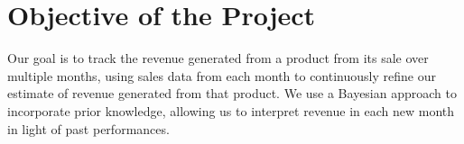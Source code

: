 \section{Objective of the Project}

Our goal is to track the revenue generated from a product from its sale over multiple months, using sales data from each month to continuously refine our estimate of revenue generated from that product.
We use a Bayesian approach to incorporate prior knowledge, allowing us to interpret revenue in each new month in light of past performances.